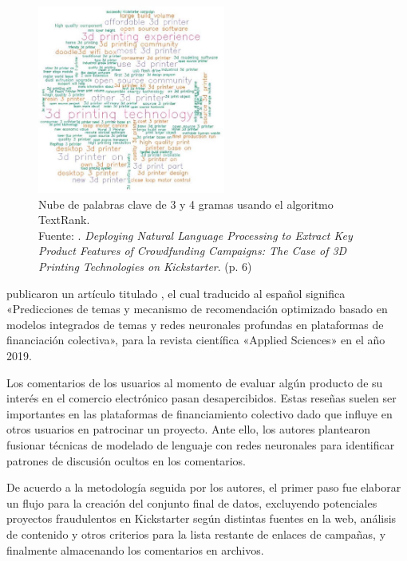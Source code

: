 \begin{figure}[!ht]
	\begin{center}
		\includegraphics[width=0.55\textwidth]{2/figures/chaichi2019.jpg}
		\caption[Nube de palabras clave de 3 y 4 gramas usando el algoritmo TextRank]{Nube de palabras clave de 3 y 4 gramas usando el algoritmo TextRank.\\
		Fuente: \cite{pr_chaichi2019nlp_3dprinting}. \textit{Deploying Natural Language Processing to Extract Key Product Features of Crowdfunding Campaigns: The Case of 3D Printing Technologies on Kickstarter}. (p. 6)}
		\label{2:fig127}
	\end{center}
\end{figure}

\newpage
\cite{pr_shafqat2019topicpredictions} publicaron un artículo titulado , el cual traducido al español significa «Predicciones de temas y mecanismo de recomendación optimizado basado en modelos integrados de temas y redes neuronales profundas en plataformas de financiación colectiva», para la revista científica «Applied Sciences» en el año 2019.

Los comentarios de los usuarios al momento de evaluar algún producto de su interés en el comercio electrónico pasan desapercibidos. Estas reseñas suelen ser importantes en las plataformas de financiamiento colectivo dado que influye en otros usuarios en patrocinar un proyecto. Ante ello, los autores plantearon fusionar técnicas de modelado de lenguaje con redes neuronales para identificar patrones de discusión ocultos en los comentarios.

De acuerdo a la metodología seguida por los autores, el primer paso fue elaborar un flujo para la creación del conjunto final de datos, excluyendo potenciales proyectos fraudulentos en Kickstarter según distintas fuentes en la web, análisis de contenido y otros criterios para la lista restante de enlaces de campañas, y finalmente almacenando los comentarios en archivos.

